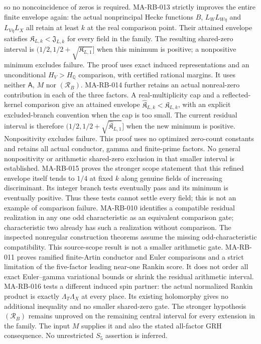 \documentclass[11pt,a4paper]{article}
\begin{document}
so no noncoincidence of zeros is required.
MA-RB-013 strictly improves the entire finite envelope again:
the actual nonprincipal Hecke functions
$B$, $L_WL_{W\eta}$ and $L_{V\eta}L_X$ all retain at least
$k$ at the real comparison point. Their attained envelope
satisfies $\mathfrak K_{L,k}<\mathfrak J_{L,k}$ for every
field in the family. The resulting shared-zero interval is
$(1/2,1/2+\sqrt{\mathfrak K_{L,1}}]$ when this minimum is
positive; a nonpositive minimum excludes failure. The proof
uses exact induced representations and an unconditional
$H_V>H_{\mathbb Q}$ comparison, with certified rational
margins. It uses neither $\mathsf A$, $M$ nor $(\mathcal R_B)$.
MA-RB-014 further retains an actual nonreal-zero contribution
in each of the three factors. A real-multiplicity cap and a
reflected-kernel comparison give an attained envelope
$\widehat{\mathfrak K}_{L,k}<\mathfrak K_{L,k}$, with
an explicit excluded-branch convention when the cap is too small.
The current residual interval is therefore
$(1/2,1/2+\sqrt{\widehat{\mathfrak K}_{L,1}}]$ when the
new minimum is positive. Nonpositivity excludes failure.
This proof uses no optimized zero-count constants and retains
all actual conductor, gamma and finite-prime factors.
No general nonpositivity or arithmetic shared-zero exclusion
in that smaller interval is established. MA-RB-015 proves the
stronger scope statement that this refined envelope itself
tends to $1/4$ at fixed $k$ along genuine fields of increasing
discriminant. Its integer branch tests eventually pass and its
minimum is eventually positive. Thus these tests cannot settle
every field; this is not an example of comparison failure.
MA-RB-010 identifies a compatible residual realization in
any one odd characteristic as an equivalent comparison gate;
characteristic two already has such a realization without
comparison. The inspected nonregular construction theorems
assume the missing odd-characteristic compatibility. This
source-scope result is not a smaller arithmetic gate.
MA-RB-011 proves ramified finite-Artin conductor and Euler
comparisons and a strict limitation of the five-factor leading
near-one Rankin score. It does not order all exact Euler--gamma
variational bounds or shrink the residual arithmetic interval.
MA-RB-016 tests a different induced spin partner: the actual
normalized Rankin product is exactly $\Lambda_T\Lambda_X$
at every place. Its existing holomorphy gives no additional
inequality and no smaller shared-zero gate.
The stronger hypothesis $(\mathcal R_B)$ remains unproved on
the remaining central interval for every extension in the family.
The input $M$ supplies it and also the stated all-factor GRH
consequence. No unrestricted $S_5$ assertion is inferred.
\end{document}
